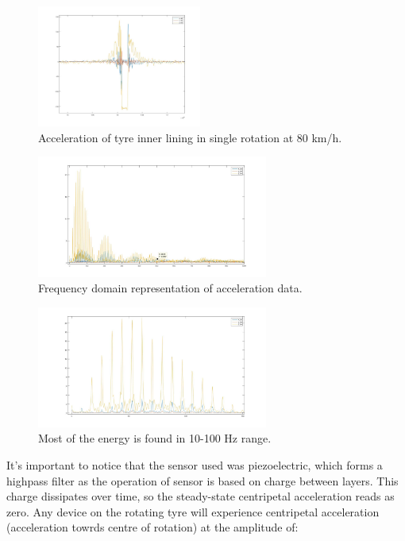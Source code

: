 \begin{figure}[htb]
\begin{center}
\includegraphics[height=4cm]{images/80kmh_timedomain_onerotation}
\end{center}
\caption{Acceleration of tyre inner lining in single rotation at 80 km/h. }
\label{80_TD_zoom}
\end{figure}

\begin{figure}[htb]
\begin{center}
\includegraphics[height=4cm]{images/FFT-80}
\end{center}
\caption{Frequency domain representation of acceleration data.}
\label{80_FFT}
\end{figure}

\begin{figure}[htb]
\begin{center}
\includegraphics[height=4cm]{images/FFT-80-zoom}
\end{center}
\caption{Most of the energy is found in 10-100 Hz range.}
\label{80_FFT_zoom}
\end{figure}

It's important to notice that the sensor used was piezoelectric, which forms a highpass filter as the operation of sensor is based on charge between layers. This charge dissipates over time, so the steady-state centripetal acceleration reads as zero. Any device on the rotating tyre will experience centripetal acceleration (acceleration towrds centre of rotation) at the amplitude of: 

